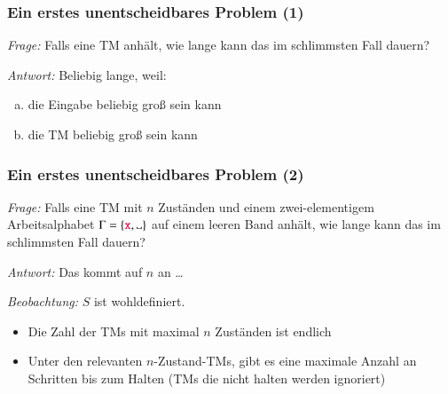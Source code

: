 \documentclass[onlymath]{beamer}
\begin{document}
\begin{frame}[t]\frametitle{Ein erstes unentscheidbares Problem (1)}

\emph{Frage:} Falls eine TM anhält, wie lange kann das im schlimmsten Fall dauern?\\
\bigskip\pause

\emph{Antwort:} Beliebig lange, weil:
\begin{enumerate}[(a)]
\item die Eingabe beliebig groß sein kann
\item die TM beliebig groß sein kann
\end{enumerate}

\end{frame}

\begin{frame}[t]\frametitle{Ein erstes unentscheidbares Problem (2)}

\emph{Frage:} Falls eine TM \alert{mit $n$ Zuständen} und \alert{einem zwei-elementigem Arbeitsalphabet $\Gamma=\{\Sterm{x}, \blank\}$} auf einem \alert{leeren Band} anhält, wie lange kann das im schlimmsten Fall dauern?\\
\bigskip\pause

\emph{Antwort:} Das kommt auf $n$ an \ldots\bigskip\pause


\emph{Beobachtung:} $S$ ist wohldefiniert.
\begin{itemize}
\item Die Zahl der TMs mit maximal $n$ Zuständen ist endlich
\item Unter den relevanten $n$-Zustand-TMs, gibt es eine maximale Anzahl an Schritten bis zum Halten (TMs die nicht halten werden ignoriert)
\end{itemize}

\end{frame}
\end{document}

